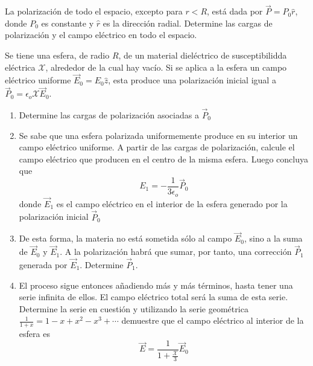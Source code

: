 \bigbreak
\np

La polarización de todo el espacio, excepto para $r < R$, está dada por $\Vec{P} = P_0\hat{r}$, donde $P_0$ es constante y $\hat{r}$ es la dirección radial. Determine las cargas de polarización y el campo eléctrico en todo el espacio.

\bigbreak

\np%

Se tiene una esfera, de radio $R$, de un material
dieléctrico de susceptibilidda eléctrica $\mathcal{X}$, alrededor de la cual hay vacío. Si se aplica a la esfera un campo eléctrico uniforme $\Vec{E}_0 = E_0\hat{z}$, esta produce una polarización inicial igual a $\Vec{P}_0 = \epsilon_o\mathcal{X}\Vec{E}_0$.

\begin{enumerate}[label=\alph*)]
    \item Determine las cargas de polarización asociadas a $\Vec{P}_0$
    \item Se sabe que una esfera polarizada uniformemente produce en su interior un campo eléctrico uniforme. A partir de las cargas de polarización, calcule el campo eléctrico que producen en el centro de la misma esfera. Luego concluya que
    \[E_1 = -\frac{1}{3\epsilon_o}\Vec{P}_0\]
    donde $\Vec{E}_1$ es el campo eléctrico en el interior de la esfera generado por la polarización inicial $\Vec{P}_0$
    \item De esta forma, la materia no está sometida sólo al campo $\Vec{E}_0$, sino a la suma de $\Vec{E}_0$ y $\Vec{E}_1$. A la polarización habrá que sumar, por tanto, una corrección $\Vec{P}_1$ generada por $\Vec{E}_1$. Determine $\Vec{P}_1$.
    \item El proceso sigue entonces añadiendo más y más términos, hasta tener una serie infinita de ellos. El campo eléctrico total será la suma de esta serie. Determine la serie en cuestión y utilizando la serie geométrica $\frac{1}{1+x} = 1 - x + x^2 - x^3 + \cdots$ demuestre que el campo eléctrico al interior de la esfera es
    \[\Vec{E}=\frac{1}{1+\frac{\mathcal{X}}{3}}\Vec{E}_0\]
\end{enumerate}

\newpage